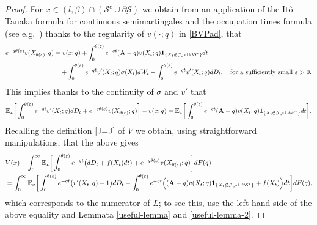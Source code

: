 \documentclass[11pt]{article} %
\numberwithin{komcounter}{section}
\renewcommand{\ul}{\underline}
\renewcommand{\epsilon}{\varepsilon}
\begin{document}
\begin{proof}
For $x\in (l,\beta) \cap (\mathcal{S}^c \cup \ul{\partial \mathcal{S}})$ we obtain from an application of the It\^{o}-Tanaka formula for continuous semimartingales and the occupation times formula (see e.g.~\cite[Chapter VI, Exercise 1.25, Corollary 1.6]{revuz2013continuous})
thanks to the regularity of $v(\cdot;q)$ in \eqref{BVPad}, that 
\begin{align*}
e^{- q \theta(\epsilon)} v(X_{\theta(\epsilon)}; q) 
&= v(x;q) 
+ \int_0^{\theta(\epsilon)} e^{-qt} (\textbf{A}-q) v(X_t;q) {\bf 1}_{\{X_t\not\in \mathcal{J}_{u^*} \cup \partial\mathcal{S}^*\}} dt \notag\\
&\quad+ \int_0^{\theta(\epsilon)} e^{-qt} v'(X_{t};q)\sigma(X_t) dW_t 
- \int_0^{\theta(\epsilon)} e^{-qt} v'(X_{t};q) dD_t , 
\quad \text{for a sufficiently small $\epsilon>0$.}
\end{align*}
This implies thanks to the continuity of $\sigma$ and $v'$ that 
\begin{align*}
\mathbb{E}_x\bigg[ \int_0^{\theta(\epsilon)} e^{-qt}  v'(X_{t};q) dD_t + e^{- q \theta(\epsilon)} v(X_{\theta(\epsilon)}; q) \bigg] - v(x;q) 
= \mathbb{E}_x\bigg[ \int_0^{\theta(\epsilon)} e^{-qt} (\textbf{A}-q) v(X_t;q) {\bf 1}_{\{X_t\not\in \mathcal{J}_{u^*} \cup \partial\mathcal{S}^*\}} dt \bigg].
\end{align*}
Recalling the definition \eqref{J=J} of $V$ we obtain, using straightforward manipulations, that the above gives 
\begin{align*}
&V(x) - \int_0^\infty \mathbb{E}_x\bigg[ \int_0^{\theta(\epsilon)} e^{-qt} \big(dD_t + f(X_t) dt) + e^{- q \theta(\epsilon)} v(X_{\theta(\epsilon)}; q) \bigg] dF(q) \\
&= \int_0^\infty \mathbb{E}_x\bigg[ \int_0^{\theta(\epsilon)} e^{-qt} \big(v'(X_{t};q) - 1 \big) dD_t - \int_0^{\theta(\epsilon)} e^{-qt} \Big((\textbf{A}-q) v(X_t;q) {\bf 1}_{\{X_t\not\in \mathcal{J}_{u^*} \cup \partial\mathcal{S}^*\}} + f(X_t) \Big) dt \bigg] dF(q),\notag
\end{align*}
which corresponds to the numerator of $L$; to see this, use the left-hand side of the above equality and Lemmata \ref{useful-lemma} and \ref{useful-lemma-2}.
 

\end{proof}
\end{document}
